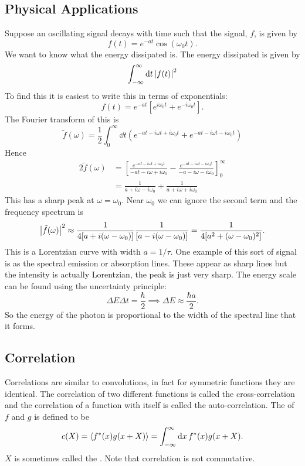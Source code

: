 \documentclass[a4paper]{article}
\begin{document}
    \subsection{Physical Applications}
    Suppose an oscillating signal decays with time such that the signal, \(f\), is given by
    \[f(t) = e^{-at}\cos(\omega_0t).\]
    We want to know what the energy dissipated is.
    The energy dissipated is given by
    \[\int_{-\infty}^{\infty} \dd{t} \abs{f(t)}^2\]
    To find this it is easiest to write this in terms of exponentials:
    \[f(t) = e^{-at}\left[e^{i\omega_0t} + e^{-i\omega_0t}\right].\]
    The Fourier transform of this is
    \[\tilde{f}(\omega) = \frac{1}{2}\int_{0}^{\infty} \dd{t} \left(e^{-at - i\omega t + i\omega_0t} + e^{-at - i\omega t - i\omega_0t}\right)\]
    Hence
    \begin{align*}
        2\tilde{f}(\omega) &= \left[\frac{e^{-at - i\omega t+i\omega_0t}}{-at - i\omega + i\omega_0} - \frac{e^{-at-i\omega t - i\omega_0t}}{-a-i\omega - i\omega_0}\right]_{0}^{\infty}\\
        &= \frac{1}{a + i\omega - i\omega_0} + \frac{1}{a + i\omega + i\omega_0}
    \end{align*}
    This has a sharp peak at \(\omega = \omega_0\).
    Near \(\omega_0\) we can ignore the second term and the frequency spectrum is
    \[\abs{\tilde{f}(\omega)}^2 \approx \frac{1}{4[a + i(\omega - \omega_0)]}\frac{1}{[a - i(\omega - \omega_0)]} = \frac{1}{4[a^2 + (\omega - \omega_0)^2]}.\]
    This is a Lorentzian curve with width \(a = 1/\tau\).
    One example of this sort of signal is as the spectral emission or absorption lines.
    These appear as sharp lines but the intensity is actually Lorentzian, the peak is just very sharp.
    The energy scale can be found using the uncertainty principle:
    \[\Delta E\Delta t = \frac{\hbar}{2} \implies \Delta E \approx \frac{\hbar a}{2}.\]
    So the energy of the photon is proportional to the width of the spectral line that it forms.
    
    \subsection{Correlation}
    Correlations are similar to convolutions, in fact for symmetric functions they are identical.
    The correlation of two different functions is called the cross-correlation and the correlation of a function with itself is called the auto-correlation.
    The  of \(f\) and \(g\) is defined to be
    \[c(X) = \langle{f^*(x)g(x + X)}\rangle = \int_{-\infty}^{\infty} \dd{x} f^*(x)g(x + X).\]
    \(X\) is sometimes called the .
    Note that correlation is not commutative.
    
\end{document}
